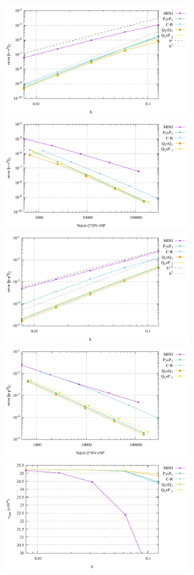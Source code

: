 \begin{center}
\includegraphics[width=8cm]{python_codes/fieldstone_112/results/exp4/errors_V.pdf}
\includegraphics[width=8cm]{python_codes/fieldstone_112/results/exp4/errors_V_ndof.pdf}\\
\includegraphics[width=8cm]{python_codes/fieldstone_112/results/exp4/errors_P.pdf}
\includegraphics[width=8cm]{python_codes/fieldstone_112/results/exp4/errors_P_ndof.pdf}\\
\includegraphics[width=8cm]{python_codes/fieldstone_112/results/exp4/vrms.pdf}

\end{center}

